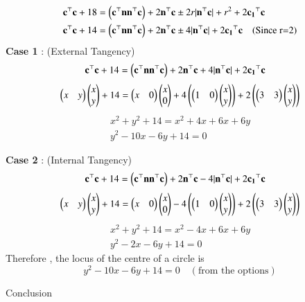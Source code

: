 \documentclass{beamer}
\begin{document}
\begin{frame}
 \begin{align}
\mathbf{c}^\top\mathbf{c}+18&=\left(\mathbf{c}^\top\mathbf{n}\mathbf{n}^\top\mathbf{c}\right)+2\mathbf{n}^\top\mathbf{c} \pm 2r|\mathbf{n}^\top\mathbf{c}|+ r^2 + 2\mathbf{c_1}^\top\mathbf{c}\\
\mathbf{c}^\top\mathbf{c}+14&=\left(\mathbf{c}^\top\mathbf{n}\mathbf{n}^\top\mathbf{c}\right)+2\mathbf{n}^\top\mathbf{c} \pm 4|\mathbf{n}^\top\mathbf{c}| + 2\mathbf{c_1}^\top\mathbf{c}  \quad (\text{Since r=2})
\end{align}
\textbf{Case 1} : (External Tangency)
\begin{align}
\mathbf{c}^\top\mathbf{c}+14&=\left(\mathbf{c}^\top\mathbf{n}\mathbf{n}^\top\mathbf{c}\right)+2\mathbf{n}^\top\mathbf{c} + 4|\mathbf{n}^\top\mathbf{c}| + 2\mathbf{c_1}^\top\mathbf{c}
\end{align}
\begin{align}
\begin{pmatrix}x&y\end{pmatrix}\begin{pmatrix}x\\y\end{pmatrix} +14 = \begin{pmatrix}x&0\end{pmatrix}\begin{pmatrix}x\\0\end{pmatrix} + 4 \left(\begin{pmatrix}1 & 0\end{pmatrix}\begin{pmatrix}x\\y\end{pmatrix}\right) + 2\left(\begin{pmatrix}3&3\end{pmatrix}\begin{pmatrix}x\\y\end{pmatrix}\right)
\end{align}
\begin{align}
x^2+y^2+14=x^2+4x+6x+6y\\
y^2-10x-6y+14=0
\end{align}
\end{frame}
\begin{frame}
\textbf{Case 2} : (Internal Tangency)
\begin{align}
\mathbf{c}^\top\mathbf{c}+14&=\left(\mathbf{c}^\top\mathbf{n}\mathbf{n}^\top\mathbf{c}\right)+2\mathbf{n}^\top\mathbf{c} - 4|\mathbf{n}^\top\mathbf{c}| + 2\mathbf{c_1}^\top\mathbf{c}
\end{align}
\begin{align}
\begin{pmatrix}x&y\end{pmatrix}\begin{pmatrix}x\\y\end{pmatrix} +14 = \begin{pmatrix}x&0\end{pmatrix}\begin{pmatrix}x\\0\end{pmatrix} - 4 \left(\begin{pmatrix}1 & 0\end{pmatrix}\begin{pmatrix}x\\y\end{pmatrix}\right) + 2\left(\begin{pmatrix}3&3\end{pmatrix}\begin{pmatrix}x\\y\end{pmatrix}\right)
\end{align}
\begin{align}
x^2+y^2+14=x^2-4x+6x+6y\\
y^2-2x-6y+14=0
\end{align}
Therefore , the locus of the centre of a circle is 
$$
 y^2-10x-6y+14=0   \quad  (\text{from the options})
$$
\end{frame}
\begin{frame}{Conclusion}
\end{frame}
\end{document}

